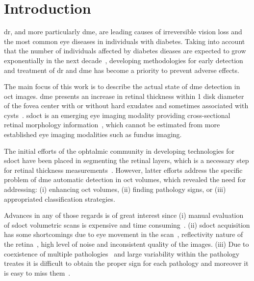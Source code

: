\graphicspath{ {./content/intro/figures/} }

\section{Introduction}
\label{sec:intro}  %

\gls{dr}, and more particularly \gls{dme}, are leading causes of irreversible vision loss and the most common eye diseases in individuals with diabetes.
Taking into account that the number of individuals affected by diabetes dieases are expected to grow exponentially in the next decade~\cite{wild2004global},
developing methodologies for early detection and treatment of \gls{dr} and \gls{dme} has become a priority to prevent adverse effects.

The main focus of this work is to describe the actual state of \gls{dme} detection in \gls{oct} images.
\gls{dme} presents an increase in retinal thickness within 1 disk diameter of the fovea center with or without hard exudates and sometimes associated with cysts~\cite{ETDRSG1985}.
\gls{sdoct} is an emerging eye imaging modality providing cross-sectional retinal morphology information~\cite{Wang2015}, which cannot be estimated from more established eye imaging modalities such as fundus imaging.

The initial efforts of the ophtalmic community in developing technologies for \gls{sdoct} have been placed in segmenting the retinal layers, which is a necessary step for retinal thickness measurements~\cite{Chiu2010,Kafieh2013}.
However, latter efforts address the specific problem of \gls{dme} automatic detection in \gls{oct} volumes, which revealed the need for addressing: (i) enhancing \gls{oct} volumes, (ii) finding pathology signs, or (iii) appropriated classification strategies.

Advances in any of those regards is of great interest since (i) manual evaluation of \gls{sdoct} volumetric scans is expensive and time consuming~\cite{Venhuizen2015}.
(ii) \gls{sdoct} acquisition has some shortcomings due to eye movement in the scan~\cite{Liu2011}, reflectivity nature of the retina~\cite{schuman2004optical}, high level of noise and inconsistent quality of the images. 
(iii) Due to coexistence of multiple pathologies~\cite{Liu2011} and large variability within the pathology treates it is difficult to obtain the proper sign for each pathology and moreover it is easy to miss them~\cite{Venhuizen2015}.


